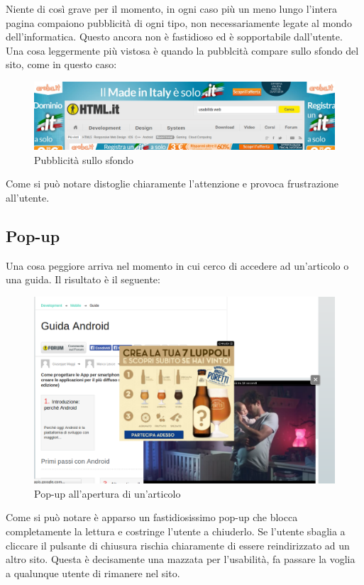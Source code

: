 Niente di così grave per il momento, in ogni caso più un meno lungo l'intera pagina compaiono pubblicità di ogni tipo, non necessariamente legate al mondo dell'informatica. Questo ancora non è fastidioso ed è sopportabile dall'utente. Una cosa leggermente più vistosa è quando la pubblcità compare sullo sfondo del sito, come in questo caso:

\begin{figure}[H]
\centering
\includegraphics[width=120mm]{images/adv6.png}
\caption{Pubblicità sullo sfondo}
\end{figure}

Come si può notare distoglie chiaramente l'attenzione e provoca frustrazione all'utente.

\subsection{Pop-up}

Una cosa peggiore arriva nel momento in cui cerco di accedere ad un'articolo o una guida. Il risultato è il seguente:

\begin{figure}[H]
\centering
\includegraphics[width=120mm]{images/adv4.png}
\caption{Pop-up all'apertura di un'articolo}
\end{figure}

Come si può notare è apparso un fastidiosissimo pop-up che blocca completamente la lettura e costringe l'utente a chiuderlo. Se l'utente sbaglia a cliccare il pulsante di chiusura rischia chiaramente di essere reindirizzato ad un altro sito. Questa è decisamente una mazzata per l'usabilità, fa passare la voglia a qualunque utente di rimanere nel sito.

